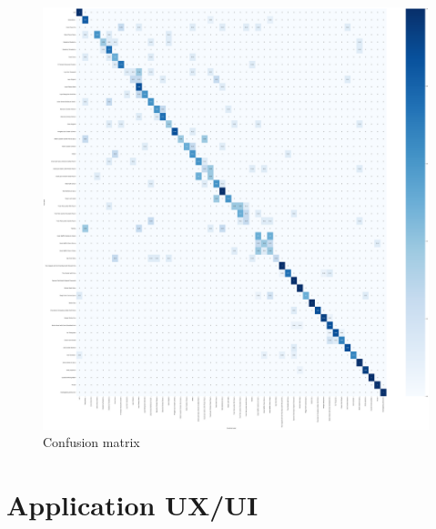 \begin{figure}[h]
    \begin{center}

        \includegraphics[scale=0.1]{pic/model/blind_pic_4_ccm.png}
    \end{center}

    \caption[Confusion matrix]{Confusion matrix}
    \label{fig:Confusion matrix}
\end{figure}




\newpage
\section{Application UX/UI}




